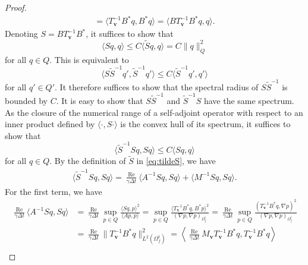 \documentclass[10pt,a4paper]{amsart}
\newcommand{\Reynolds}{{\operatorname{Re}}}
\newcommand{\bv}{{\mathbf{v}}}
\begin{document}
\begin{proof}
\begin{equation}
\begin{aligned}
     = \langle T_\bv^{-1} B^* q, B^* q \rangle 
     = \langle B T_\bv^{-1} B^* q, q \rangle.
    \end{aligned}
\end{equation}
Denoting $S = B T_\bv^{-1} B^*$, it suffices to show that
\begin{equation}
    \langle S q, q \rangle \leq C \langle \tilde{S} q, q \rangle = C \|q\|_Q^2
\end{equation}
for all $q \in Q$. This is equivalent to
\begin{equation}
    \langle S \tilde{S}^{-1} q', \tilde{S}^{-1} q' \rangle \leq C \langle \tilde{S}^{-1} q', q' \rangle
\end{equation}
for all $q' \in Q'$. It therefore suffices to show that the spectral radius of $S \tilde{S}^{-1}$ is bounded by $C$.
It is easy to show that $S \tilde{S}^{-1}$ and $\tilde{S}^{-1} S$ have the same spectrum.
As the closure of the numerical range of a self-adjoint operator with respect to an inner product defined by $\langle \cdot, S\cdot \rangle$ is the convex hull of its spectrum, it suffices to show that
\begin{equation}
    \langle \tilde{S}^{-1} S q, S q \rangle \leq C \langle S q, q \rangle
\end{equation}
for all $q \in Q$. By the definition of $\tilde{S}$ in \eqref{eq:tildeS}, we have
\begin{equation}
    \begin{aligned}
        \langle \tilde{S}^{-1} S q, S q \rangle = \frac{\Reynolds}{\gamma\Delta t} \langle A^{-1} S q, S q \rangle + \langle M^{-1} S q, S q \rangle.
    \end{aligned}
\end{equation}
For the first term, we have
\begin{equation}
    \begin{aligned}
        \frac{\Reynolds}{\gamma\Delta t} \langle A^{-1} S q, S q \rangle 
        &= \frac{\Reynolds}{\gamma\Delta t} \sup_{p \in Q} \frac{\langle S q, p \rangle^2}{\langle A p, p \rangle} 
         = \sup_{p \in Q} \frac{\langle T_\bv^{-1} B^* q, B^* p \rangle^2}{(\nabla p, \nabla p)_{\Omega_f^t}} 
         = \frac{\Reynolds}{\gamma\Delta t} \sup_{p \in Q} \frac{(T_\bv^{-1} B^* q, \nabla p)^2}{(\nabla p, \nabla p)_{\Omega_f^t}} \\
        &= \frac{\Reynolds}{\gamma\Delta t} \|T_\bv^{-1} B^* q\|_{L^2(\Omega_f^t)}^2 
         = \left\langle \frac{\Reynolds}{\gamma\Delta t} M_\bv T_\bv^{-1} B^* q, T_\bv^{-1} B^* q \right\rangle \\

\end{aligned}
\end{equation}
\end{proof}
\end{document}
